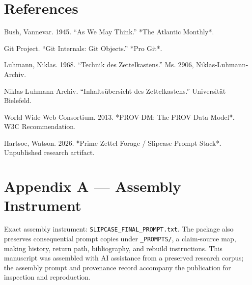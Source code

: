 \documentclass[11pt]{article}
\begin{document}
\section*{References}



Bush, Vannevar. 1945. “As We May Think.” *The Atlantic Monthly*.



Git Project. “Git Internals: Git Objects.” *Pro Git*.



Luhmann, Niklas. 1968. “Technik des Zettelkastens.” Ms. 2906, Niklas-Luhmann-Archiv.



Niklas-Luhmann-Archiv. “Inhaltsübersicht des Zettelkastens.” Universität Bielefeld.



World Wide Web Consortium. 2013. *PROV-DM: The PROV Data Model*. W3C Recommendation.



Hartsoe, Watson. 2026. *Prime Zettel Forage / Slipcase Prompt Stack*. Unpublished research artifact.
\appendix
\section*{Appendix A — Assembly Instrument}
Exact assembly instrument: \texttt{SLIPCASE\_FINAL\_PROMPT.txt}. The package also preserves consequential prompt copies under \texttt{\_PROMPTS/}, a claim-source map, making history, return path, bibliography, and rebuild instructions. This manuscript was assembled with AI assistance from a preserved research corpus; the assembly prompt and provenance record accompany the publication for inspection and reproduction.
\end{document}
